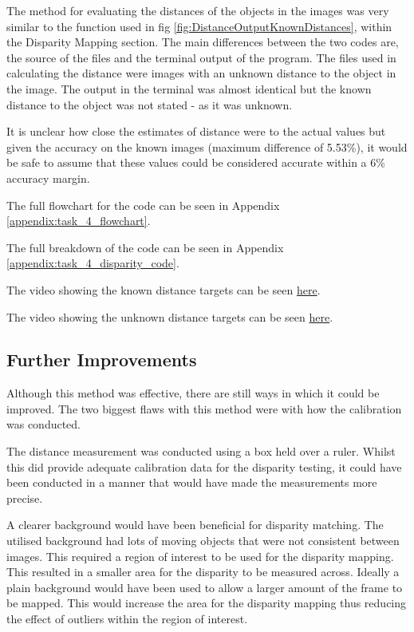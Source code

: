 \documentclass[conference]{IEEEtran}
\begin{document}
The method for evaluating the distances of the objects in the images was very similar to the function used in fig \ref{fig:DistanceOutputKnownDistances}, within the Disparity Mapping section. The main differences between the two codes are, the source of the files and the terminal output of the program. The files used in calculating the distance were images with an unknown distance to the object in the image. The output in the terminal was almost identical but the known distance to the object was not stated - as it was unknown. 

It is unclear how close the estimates of distance were to the actual values but given the accuracy on the known images (maximum difference of 5.53\%), it would be safe to assume that these values could be considered accurate within a 6\% accuracy margin.

The full flowchart for the code can be seen in Appendix \ref{appendix:task_4_flowchart}.

The full breakdown of the code can be seen in Appendix \ref{appendix:task_4_disparity_code}.

The video showing the known distance targets can be seen \href{https://youtu.be/jV-Ht9x28nk}{here}.

The video showing the unknown distance targets can be seen \href{https://youtu.be/g0bPXUbjqvo}{here}.

\subsection{Further Improvements}

Although this method was effective, there are still ways in which it could be improved. The two biggest flaws with this method were with how the calibration was conducted.

The distance measurement was conducted using a box held over a ruler. Whilst this did provide adequate calibration data for the disparity testing, it could have been conducted in a manner that would have made the measurements more precise. 

A clearer background would have been beneficial for disparity matching. The utilised background had lots of moving objects that were not consistent between images. This required a region of interest to be used for the disparity mapping. This resulted in a smaller area for the disparity to be measured across. Ideally a plain background would have been used to allow a larger amount of the frame to be mapped. This would increase the area for the disparity mapping thus reducing the effect of outliers within the region of interest. 
\end{document}
